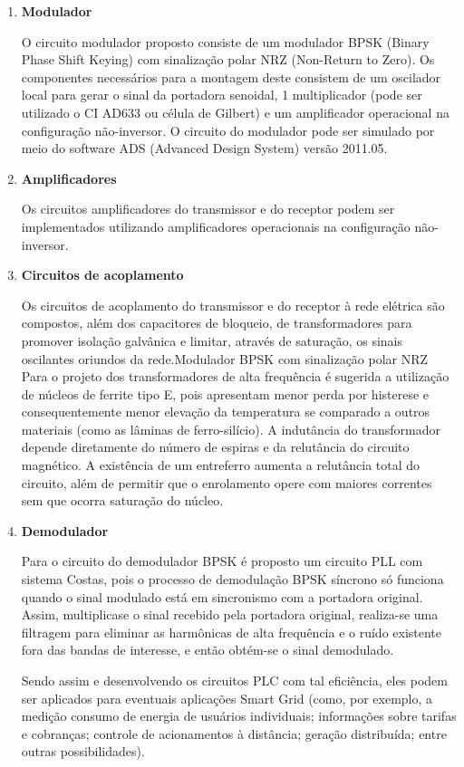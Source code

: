 	\begin{enumerate}

		\item \textbf{Modulador}

		 O circuito modulador proposto consiste de um modulador BPSK (Binary Phase Shift Keying) com sinalização polar NRZ (Non-Return to Zero). Os componentes necessários para a montagem deste consistem de um oscilador local para gerar o sinal da portadora senoidal, 1 multiplicador (pode ser utilizado o CI AD633 ou célula de Gilbert) e um amplificador operacional na configuração não-inversor. O circuito do modulador pode ser simulado por meio do software ADS (Advanced Design System) versão 2011.05.

		\item \textbf{Amplificadores}

		Os circuitos amplificadores do transmissor e do receptor podem ser implementados utilizando amplificadores operacionais na configuração não-inversor.

		\item \textbf{Circuitos de acoplamento}

		Os circuitos de acoplamento do transmissor e do receptor à rede elétrica são compostos, além dos capacitores de bloqueio, de transformadores para promover isolação galvânica e limitar, através de saturação, os sinais oscilantes oriundos da rede.Modulador BPSK com sinalização polar NRZ Para o projeto dos transformadores de alta frequência é sugerida a utilização de núcleos de ferrite tipo E, pois apresentam menor perda por histerese e consequentemente menor elevação da temperatura se comparado a outros materiais (como as lâminas de ferro-silício). A indutância do transformador depende diretamente do número de espiras e da relutância do circuito magnético. A existência de um entreferro aumenta a relutância total do circuito, além de permitir que o enrolamento opere com maiores correntes sem que ocorra saturação do núcleo.

		\item \textbf{Demodulador}

	Para o circuito do demodulador BPSK é proposto um circuito PLL com sistema Costas, pois o processo de demodulação BPSK síncrono só funciona quando o sinal modulado está em sincronismo com a portadora original. Assim, multiplicase o sinal recebido pela portadora original, realiza-se uma filtragem para eliminar as harmônicas de alta frequência e o ruído existente fora das bandas de interesse, e então obtém-se o sinal demodulado.

	Sendo assim e desenvolvendo os circuitos PLC com tal eficiência, eles podem ser aplicados para eventuais aplicações Smart Grid (como, por exemplo, a medição consumo de energia de usuários individuais; informações sobre tarifas e cobranças; controle de acionamentos à distância; geração distribuída; entre outras possibilidades).

	\end{enumerate}

